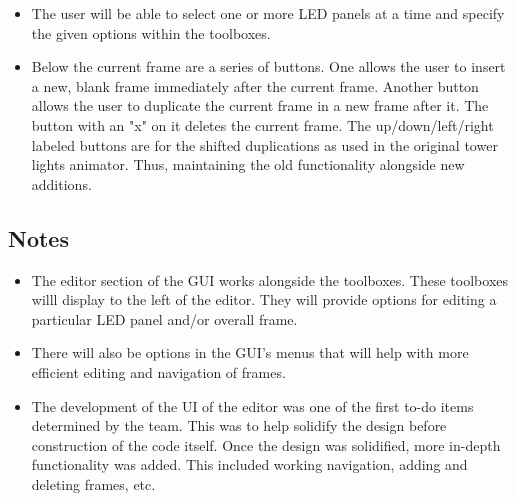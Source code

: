 \documentclass{article}
\begin{document}
\begin{itemize}
\begin{itemize}
			\item The user will be able to select one or more LED panels at a time and specify the given options within the toolboxes.
			\item Below the current frame are a series of buttons. One allows the user to insert a new, blank frame immediately after the current frame. Another button allows the user to duplicate the current frame in a new frame after it.  The button with an "x" on it deletes the current frame.  The up/down/left/right labeled buttons are for the shifted duplications as used in the original tower lights animator.  Thus, maintaining the old functionality alongside new additions. 
		\end{itemize}
	\end{itemize}
	
	\subsection{Notes}
	\begin{itemize}
		\item The editor section of the GUI  works alongside the toolboxes. These toolboxes willl display to the left of the editor. They will provide options for editing a particular LED panel and/or overall frame. %
		\item There will also be options in the GUI's menus that will help with more efficient editing and navigation of frames.
		\item The development of the UI of the editor was one of the first to-do items determined by the team.  This was to help solidify the design before construction of the code itself. Once the design was solidified, more in-depth functionality was added.  This included working navigation, adding and deleting frames, etc.
	\end{itemize}
	
\end{document}
